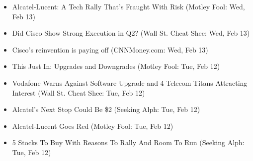 \documentclass[11pt,asymmetric]{article}
\begin{document}
\begin{itemize}
\item Alcatel-Lucent: A Tech Rally That's Fraught With Risk (Motley Fool: Wed, Feb 13)
\item Did Cisco Show Strong Execution in Q2? (Wall St. Cheat Shee: Wed, Feb 13)
\item Cisco's reinvention is paying off (CNNMoney.com: Wed, Feb 13)
\item This Just In: Upgrades and Downgrades (Motley Fool: Tue, Feb 12)
\item Vodafone Warns Against Software Upgrade and 4 Telecom Titans Attracting Interest (Wall St. Cheat Shee: Tue, Feb 12)
\item Alcatel's Next Stop Could Be \$2 (Seeking Alph: Tue, Feb 12)
\item Alcatel-Lucent Goes Red (Motley Fool: Tue, Feb 12)
\item 5 Stocks To Buy With Reasons To Rally And Room To Run (Seeking Alph: Tue, Feb 12)
\end{itemize}
\end{document}
